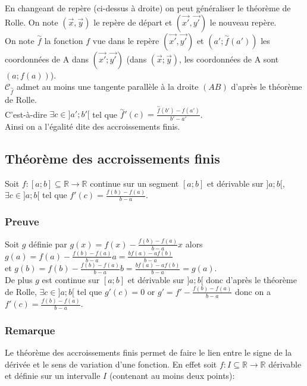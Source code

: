 \documentclass[a4paper,10pt]{book} %
\newcommand{\R}{\mathbb{R}}
\begin{document}
En changeant de repère (ci-dessus à droite) on peut généraliser le théorème de Rolle. On note $(\vec{x},\vec{y})$ le repère de départ et $(\vec{x'},\vec{y'})$ le nouveau repère.\\

On note $\overset{\sim}{f}$ la fonction $f$ vue dans le repère $(\vec{x'},\vec{y'})$ et $(a';\overset{\sim}{f}(a'))$ les coordonnées de A dans $(\vec{x'};\vec{y'})$ (dans $(\vec{x}; \vec{y})$, les coordonnées de A sont $(a; f(a))$).\\

$\mathcal{C}_{\overset{\sim}{f}}$ admet au moins une tangente parallèle à la droite $(AB)$ d'après le théorème de Rolle.\\
C'est-à-dire $\exists c\in ]a';b'[$ tel que $\overset{\sim}{f}{}'(c)=\frac{\overset{\sim}{f}(b')-\overset{~}{f}(a')}{b'-a'}$.\\

Ainsi on a l'égalité dite des accroissements finis.

\newpage

\subsection{Théorème des accroissements finis}
Soit $f : [a;b]\subseteq \R\rightarrow \R$ continue sur un segment $[a;b]$ et dérivable sur $]a;b[$,\\
$\exists c\in ]a;b[$ tel que $f'(c)=\frac{f(b)-f(a)}{b-a}$.

\subsubsection{Preuve}
Soit $g$ définie par $g(x)=f(x)-\frac{f(b)-f(a)}{b-a}x$ alors $g(a)=f(a)-\frac{f(b)-f(a)}{b-a}a=\frac{bf(a)-af(b)}{b-a}$\\
et $g(b)=f(b)-\frac{f(b)-f(a)}{b-a}b=\frac{bf(a)-af(b)}{b-a}=g(a)$.\\

De plus $g$ est continue sur $[a;b]$ et dérivable sur $]a;b[$ donc d'après le théorème de Rolle, $\exists c\in ]a;b[$ tel que $g'(c)=0$ or $g'=f'-\frac{f(b)-f(a)}{b-a}$ donc on a $f'(c)=\frac{f(b)-f(a)}{b-a}$.

\subsubsection{Remarque}
\begin{spacing}{0.7}Le théorème des accroissements finis permet de faire le lien entre le signe de la dérivée et le sens de variation d'une fonction. En effet soit $f: I\subseteq \R \rightarrow \R$ dérivable et définie sur un intervalle $I$ (contenant au moins deux points):
\end{spacing}
\end{document}
